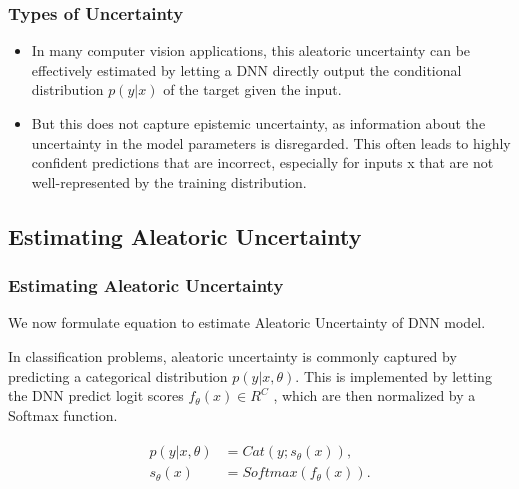 \documentclass{beamer}
\begin{document}
\begin{frame}
\frametitle{Types of Uncertainty}

\begin{itemize}
\item In many computer vision applications, this aleatoric uncertainty can be effectively estimated by letting a DNN directly output the conditional distribution $p(y|x)$ of the target given the input.
\item But this does not capture epistemic uncertainty, as information about the uncertainty in the model parameters is disregarded. This often leads to highly confident predictions that are incorrect, especially for inputs x that are not well-represented by the training distribution.
\end{itemize}


\end{frame}


\subsection{Estimating Aleatoric Uncertainty}
\begin{frame}
\frametitle{Estimating Aleatoric Uncertainty}

We now formulate equation to estimate Aleatoric Uncertainty of DNN model.

\vspace{0.3cm}

\hspace{0.3cm} In classification problems, aleatoric uncertainty is commonly captured by predicting a categorical distribution $p(y|x, θ)$. This is implemented by letting the DNN predict logit scores $f_\theta (x) \in R^C  $  , which are then normalized by a Softmax function.

\begin{align}
\begin{split}
 p(y|x, \theta) &= Cat(y; s_\theta (x)) ,
\\
 s_\theta (x) &= Softmax(f_\theta(x)) .
\end{split}
\end{align}

\end{frame}
\end{document}
